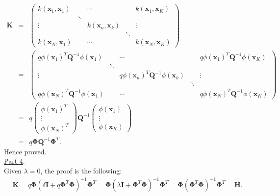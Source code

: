 \documentclass[a4paper, 11pt]{article}\usepackage[]{graphicx}\usepackage[]{color}
\begin{document}
\begin{eqnarray}
\mathbf{K} &=& \left( \begin{array}{ccccc}
k(\mathbf{x}_1, \mathbf{x}_1) & & \cdots & & k(\mathbf{x}_1, \mathbf{x}_K) \\
 & \ddots & & & \\
\vdots & & k(\mathbf{x}_n, \mathbf{x}_k) & & \vdots \\
 & & & \ddots & \\
k(\mathbf{x}_N, \mathbf{x}_1) & & \cdots & & k(\mathbf{x}_N, \mathbf{x}_K) \end{array} \right) \nonumber \\
&=& \left( \begin{array}{ccccc}
q \phi (\mathbf{x}_1)^T \mathbf{Q}^{-1} \phi (\mathbf{x}_1) & & \cdots & & q \phi (\mathbf{x}_1)^T \mathbf{Q}^{-1} \phi (\mathbf{x}_K) \\
 & \ddots & & & \\
\vdots & & q \phi (\mathbf{x}_n)^T \mathbf{Q}^{-1} \phi (\mathbf{x}_k) & & \vdots \\
 & & & \ddots & \\
q \phi (\mathbf{x}_N)^T \mathbf{Q}^{-1} \phi (\mathbf{x}_1) & & \cdots & & q \phi (\mathbf{x}_N)^T \mathbf{Q}^{-1} \phi (\mathbf{x}_K) \end{array} \right) \nonumber \\
&=& q \left( \begin{array}{c}
\phi (\mathbf{x}_1)^T \\
\vdots \\
\phi (\mathbf{x}_N)^T \end{array} \right) \mathbf{Q}^{-1} \left( \begin{array}{c}
\phi (\mathbf{x}_1) \\
\vdots \\
\phi (\mathbf{x}_K) \end{array} \right) \nonumber \\
&=& q \mathbf{\Phi} \mathbf{Q}^{-1} \mathbf{\Phi}^T. \nonumber
\end{eqnarray}
Hence proved.\\
\newline \underline{Part 4}. \\
\newline Given $\lambda = 0$, the proof is the following:
\begin{eqnarray}
\mathbf{K} = q \mathbf{\Phi} (\delta \mathbf{I} + q \mathbf{\Phi}^T \mathbf{\Phi})^{-1} \mathbf{\Phi}^T = \mathbf{\Phi} (\lambda \mathbf{I} + \mathbf{\Phi}^T \mathbf{\Phi})^{-1} \mathbf{\Phi}^T = \mathbf{\Phi} (\mathbf{\Phi}^T \mathbf{\Phi})^{-1} \mathbf{\Phi}^T = \mathbf{H}. \nonumber
\end{eqnarray}
\end{document}
